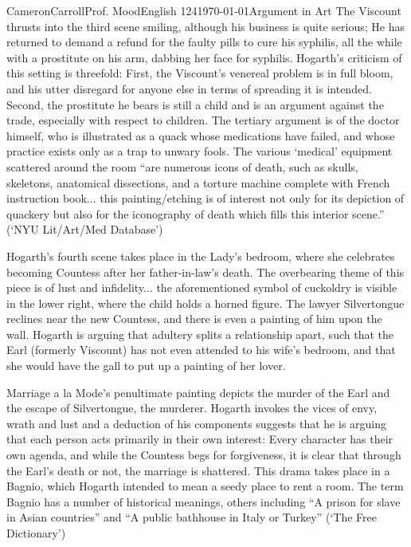 \documentclass[12pt,letterpaper]{article}
\begin{document}
\begin{mla}{Cameron}{Carroll}{Prof. Mood}{English 124}{\today}{Argument in Art}
The Viscount thrusts into the third scene smiling, although his business is quite serious; He has returned to demand a refund for the faulty pills to cure his syphilis, all the while with a prostitute on his arm, dabbing her face for syphilis. Hogarth's criticism of this setting is threefold: First, the Viscount's venereal problem is in full bloom, and his utter disregard for anyone else in terms of spreading it is intended. Second, the prostitute he bears is still a child and is an argument against the trade, especially with respect to children. The tertiary argument is of the doctor himself, who is illustrated as a quack whose medications have failed, and whose practice exists only as a trap to unwary fools. The various `medical' equipment scattered around the room ``are numerous icons of death, such as skulls, skeletons, anatomical dissections, and a torture machine complete with French instruction book... this painting/etching is of interest not only for its depiction of quackery but also for the iconography of death which fills this interior scene.'' (`NYU Lit/Art/Med Database')

Hogarth's fourth scene takes place in the Lady's bedroom, where she celebrates becoming Countess after her father-in-law's death. The overbearing theme of this piece is of lust and infidelity... the aforementioned symbol of cuckoldry is visible in the lower right, where the child holds a horned figure. The lawyer Silvertongue reclines near the new Countess, and there is even a painting of him upon the wall. Hogarth is arguing that adultery splits a relationship apart, such that the Earl (formerly Viscount) has not even attended to his wife's bedroom, and that she would have the gall to put up a painting of her lover.

Marriage a la Mode's penultimate painting depicts the murder of the Earl and the escape of Silvertongue, the murderer. Hogarth invokes the vices of envy, wrath and lust and a deduction of his components suggests that he is arguing that each person acts primarily in their own interest: Every character has their own agenda, and while the Countess begs for forgiveness, it is clear that through the Earl's death or not, the marriage is shattered. This drama takes place in a Bagnio, which Hogarth intended to mean a seedy place to rent a room. The term Bagnio has a number of historical meanings, others including ``A prison for slave in Asian countries'' and ``A public bathhouse in Italy or Turkey'' (`The Free Dictionary')


\end{mla}
\end{document}
